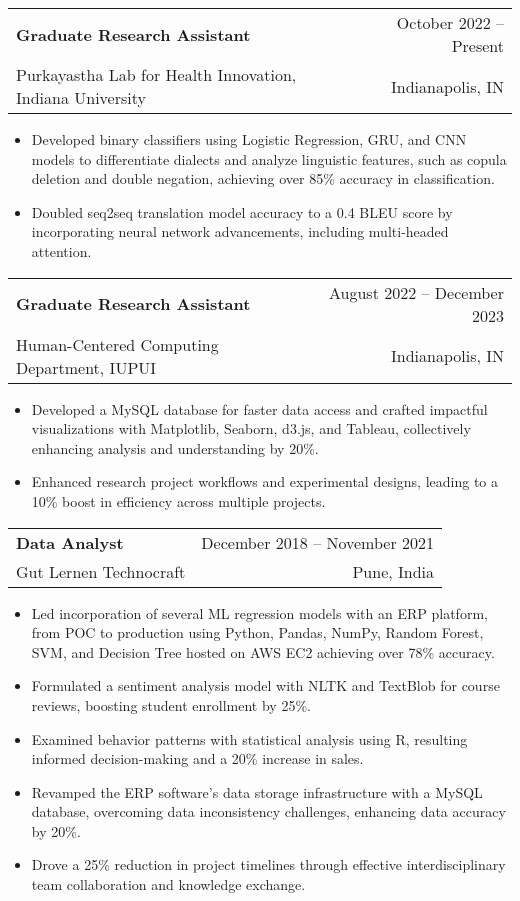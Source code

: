 \documentclass[letterpaper,11pt]{article}
\makeatletter
\newcommand{\resumeItem}[1]{
  \item\small{
    {#1 \vspace{-2pt}}
  }
}
\newcommand{\resumeSubheading}[4]{
  \vspace{-2pt}\item
    \begin{tabular*}{0.97\textwidth}[t]{l@{\extracolsep{\fill}}r}
      \textbf{#1} & #2 \\
    \small#3 & \small #4 \\
    \end{tabular*}\vspace{-7pt}
}
\newcommand{\resumeItemListStart}{\begin{itemize}}
\newcommand{\resumeItemListEnd}{\end{itemize}\vspace{-5pt}}
\newcommand{\JobDescriptionGraduateResearchAssistantOne}{Developed binary classifiers using Logistic Regression, GRU, and CNN models to differentiate dialects and analyze linguistic features, such as copula deletion and double negation, achieving over 85\% accuracy in classification.}
\newcommand{\JobDescriptionGraduateResearchAssistantTwo}{Doubled seq2seq translation model accuracy to a 0.4 BLEU score by incorporating neural network advancements, including multi-headed attention.}
\makeatother
\begin{document}
    \resumeSubheading
      {Graduate Research Assistant}{October 2022 -- Present}
      {Purkayastha Lab for Health Innovation, Indiana University}{Indianapolis, IN}
      \resumeItemListStart
        \resumeItem{\JobDescriptionGraduateResearchAssistantOne}
        \resumeItem{\JobDescriptionGraduateResearchAssistantTwo}
      \resumeItemListEnd

    \resumeSubheading
      {Graduate Research Assistant}{August 2022 -- December 2023}
      {Human-Centered Computing Department, IUPUI}{Indianapolis, IN}
      \resumeItemListStart
        \resumeItem{Developed a MySQL database for faster data access and crafted impactful visualizations with Matplotlib, Seaborn, d3.js, and Tableau, collectively enhancing analysis and understanding by 20\%.}
        \resumeItem{Enhanced research project workflows and experimental designs, leading to a 10\% boost in efficiency across multiple projects.}
      \resumeItemListEnd


    \resumeSubheading
      {Data Analyst}{December 2018 -- November 2021}
      {Gut Lernen Technocraft}{Pune, India}
      \resumeItemListStart
        \resumeItem{Led incorporation of several ML regression models with an ERP platform, from POC to production using Python, Pandas, NumPy, Random Forest, SVM, and Decision Tree hosted on AWS EC2 achieving over 78\% accuracy.}
        \resumeItem{Formulated a sentiment analysis model with NLTK and TextBlob for course reviews, boosting student enrollment by 25\%.}
        \resumeItem{Examined behavior patterns with statistical analysis using R, resulting informed decision-making and a 20\% increase in sales.}
        \resumeItem{Revamped the ERP software's data storage infrastructure with a MySQL database, overcoming data inconsistency challenges, enhancing data accuracy by 20\%.}
        \resumeItem{Drove a 25\% reduction in project timelines through effective interdisciplinary team collaboration and knowledge exchange.}
        
    \resumeItemListEnd

\end{document}
